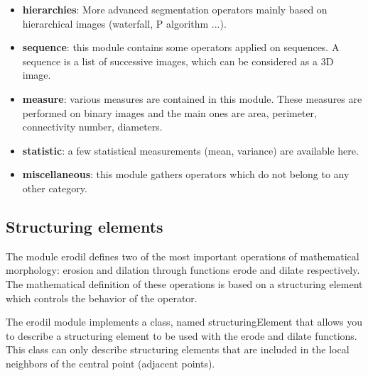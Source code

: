 \documentclass[a4paper,10pt,oneside]{article}
\begin{document}
\begin{itemize}
\item \textbf{hierarchies}: More advanced segmentation operators mainly based
on hierarchical images (waterfall, P algorithm ...).
\item \textbf{sequence}: this module contains some operators applied on sequences. 
A sequence is a list of successive images, which can be considered as a 3D image.
\item \textbf{measure}: various measures are contained in this module. These measures 
are performed on binary images and the main ones are area, perimeter, connectivity 
number, diameters.
\item \textbf{statistic}: a few statistical measurements (mean, variance) are 
available here.
\item \textbf{miscellaneous}: this module gathers operators which do not belong to
any other category.
\end{itemize}

\subsection{Structuring elements}

The module erodil defines two of the most important operations of mathematical
morphology: erosion and dilation through functions erode and dilate respectively.
The mathematical definition of these operations is based on a structuring
element which controls the behavior of the operator.

The erodil module implements a class, named structuringElement that allows you to
describe a structuring element to be used with the erode and dilate functions. This
class can only describe structuring elements that are included in the local 
neighbors of the central point (adjacent points).
\end{document}
